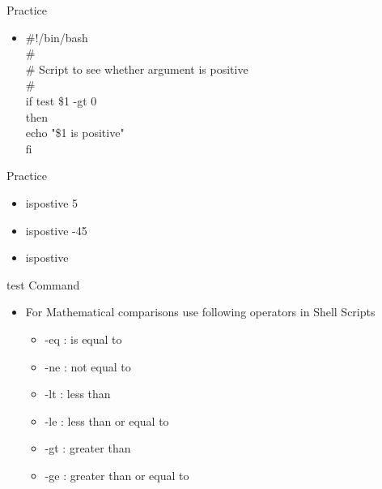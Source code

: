 \documentclass{beamer}
\begin{document}
\begin{frame}{Practice}
\begin{itemize}
\item \#!/bin/bash \\
\# \\
\# Script to see whether argument is positive \\
\# \\
if test \$1 -gt 0 \\
then \\
	echo "\$1 is positive" \\
fi
\end{itemize}
\end{frame}

\begin{frame}{Practice}
\begin{itemize}
\item ispostive 5
\item ispostive -45
\item ispostive
\end{itemize}
\end{frame}

\begin{frame}{test Command}
\begin{itemize}
\item For Mathematical comparisons use following operators in Shell Scripts
\begin{itemize}
\item -eq : is equal to
\item -ne : not equal to
\item -lt : less than
\item -le : less than or equal to
\item -gt : greater than
\item -ge : greater than or equal to
\end{itemize}
\end{itemize}
\end{frame}
\end{document}
